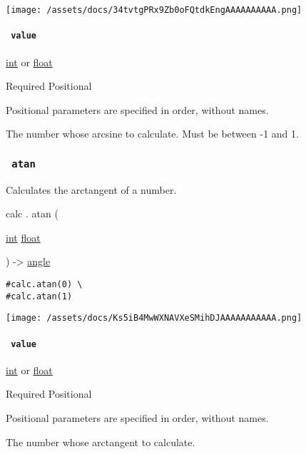 \texttt{[image: /assets/docs/34tvtgPRx9Zb0oFQtdkEngAAAAAAAAAA.png]}

\paragraph{\texorpdfstring{\texttt{\ value\ }}{ value }}\label{functions-acos-value}

\href{/docs/reference/foundations/int/}{int} {or}
\href{/docs/reference/foundations/float/}{float}

{Required} {{ Positional }}

\label{functions-acos-value-positional-tooltip}
Positional parameters are specified in order, without names.

The number whose arcsine to calculate. Must be between -1 and 1.

\subsubsection{\texorpdfstring{\texttt{\ atan\ }}{ atan }}\label{functions-atan}

Calculates the arctangent of a number.

calc { . } { atan } (

{ \href{/docs/reference/foundations/int/}{int}
\href{/docs/reference/foundations/float/}{float} }

) -\textgreater{} \href{/docs/reference/layout/angle/}{angle}

\begin{verbatim}
#calc.atan(0) \
#calc.atan(1)
\end{verbatim}

\texttt{[image: /assets/docs/Ks5iB4MwWXNAVXeSMihDJAAAAAAAAAAA.png]}

\paragraph{\texorpdfstring{\texttt{\ value\ }}{ value }}\label{functions-atan-value}

\href{/docs/reference/foundations/int/}{int} {or}
\href{/docs/reference/foundations/float/}{float}

{Required} {{ Positional }}

\label{functions-atan-value-positional-tooltip}
Positional parameters are specified in order, without names.

The number whose arctangent to calculate.

